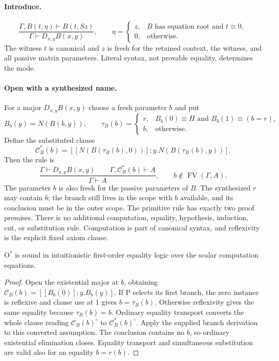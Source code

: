 \paragraph{Introduce.}
\[
 \frac{\Gamma,B(t,\eta)\vdash B(t,Sz)}
      {\Gamma\vdash D_{x,y}B(x,y)},\qquad
 \eta=\begin{cases}
 z,&B\text{ has equation root and }t\equiv0,\\
 0,&\text{otherwise}.
 \end{cases}
 \tag{I}
\]
The witness $t$ is canonical and $z$ is fresh for the retained context,
the witness, and all passive matrix parameters. Literal syntax, not
provable equality, determines the mode.

\paragraph{Open with a synthesized name.}
For a major $D_{x,y}B(x,y)$ choose a fresh parameter $b$ and put
\[
 B_b(y)=N(B(b,y)),\qquad
 \tau_B(b)=\begin{cases}
 r,&B_b(0)\equiv H\text{ and }B_b(1)\equiv(b=r),\\
 b,&\text{otherwise}.
 \end{cases}
 \tag{P}
\]
Define the substituted clause
\[
 \mathcal C^*_B(b)=
 [[N(B(\tau_B(b),0))];y.N(B(\tau_B(b),y))].
\]
Then the rule is
\[
 \frac{\Gamma\vdash D_{x,y}B(x,y)\qquad
       \Gamma,\mathcal C^*_B(b)\vdash A}
      {\Gamma\vdash A},
 \qquad b\notin\operatorname{FV}(\Gamma,A).
 \tag{O$^*$}
\]
The parameter $b$ is also fresh for the passive parameters of $B$.
The synthesized $r$ may contain $b$; the branch still lives in the scope
with $b$ available, and its conclusion must be in the outer scope. The
primitive rule has exactly two proof premises. There is no additional
computation, equality, hypothesis, induction, cut, or substitution rule.
Computation is part of canonical syntax, and reflexivity is the explicit
fixed axiom clause.

\begin{lemma}
\label{lem:opening-sound}
O$^*$ is sound in intuitionistic first-order equality logic over the scalar
computation equations.
\end{lemma}
\begin{proof}
Open the existential major at $b$, obtaining
$\mathcal C_B(b)=[[B_b(0)];y.B_b(y)]$. If P selects its first branch,
the zero instance is reflexive and clause use at $1$ gives $b=\tau_B(b)$.
Otherwise reflexivity gives the same equality because $\tau_B(b)=b$.
Ordinary equality transport converts the whole clause reading
$\mathcal C_B(b)^\circ$ to
$\mathcal C^*_B(b)^\circ$. Apply the supplied branch derivation to this
converted assumption. The conclusion contains no $b$, so ordinary
existential elimination closes. Equality transport and simultaneous
substitution are valid also for an equality $b=r(b)$.
\end{proof}


